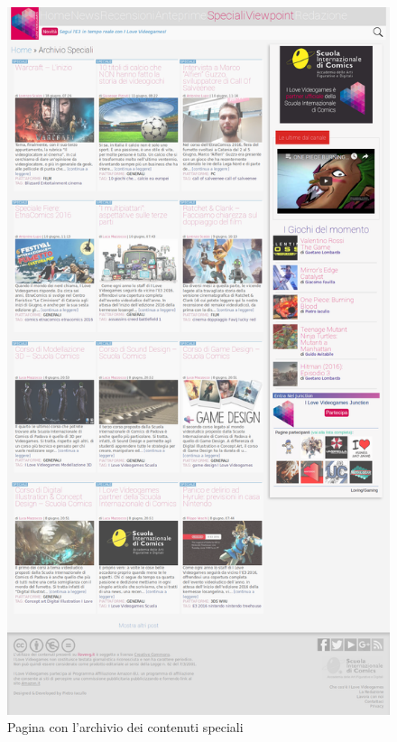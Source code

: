 \documentclass[../ProgettoTecWeb2.tex]{subfiles}
\begin{document}
	\begin{figure} [H]
			\centering
			\includegraphics[scale=0.24]{img/SpecialiCompleta}
			\caption{Pagina con l'archivio dei contenuti speciali}
	\end{figure}
\end{document}
